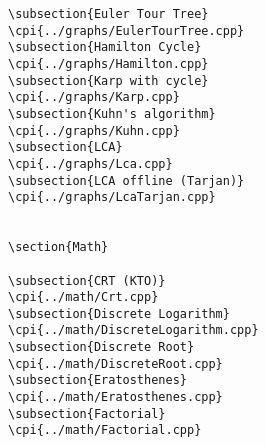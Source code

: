 {\begin{verbatim}
\subsection{Euler Tour Tree}
\cpi{../graphs/EulerTourTree.cpp}
\subsection{Hamilton Cycle}
\cpi{../graphs/Hamilton.cpp}
\subsection{Karp with cycle}
\cpi{../graphs/Karp.cpp}
\subsection{Kuhn's algorithm}
\cpi{../graphs/Kuhn.cpp}
\subsection{LCA}
\cpi{../graphs/Lca.cpp}
\subsection{LCA offline (Tarjan)}
\cpi{../graphs/LcaTarjan.cpp}


\section{Math}

\subsection{CRT (KTO)}
\cpi{../math/Crt.cpp}
\subsection{Discrete Logarithm}
\cpi{../math/DiscreteLogarithm.cpp}
\subsection{Discrete Root}
\cpi{../math/DiscreteRoot.cpp}
\subsection{Eratosthenes}
\cpi{../math/Eratosthenes.cpp}
\subsection{Factorial}
\cpi{../math/Factorial.cpp}

\end{verbatim}}
